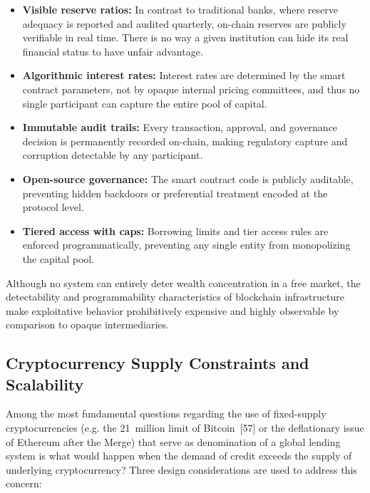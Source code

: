 \documentclass[12pt,a4paper]{report}
\begin{document}
\begin{itemize}[noitemsep]
\item \textbf{Visible reserve ratios:} In contrast to traditional banks, where reserve adequacy is reported and audited quarterly, on-chain reserves are publicly verifiable in real time. There is no way a given institution can hide its real financial status to have unfair advantage.
\item \textbf{Algorithmic interest rates:} Interest rates are determined by the smart contract parameters, not by opaque internal pricing committees, and thus no single participant can capture the entire pool of capital.
\item \textbf{Immutable audit trails:} Every transaction, approval, and governance decision is permanently recorded on-chain, making regulatory capture and corruption detectable by any participant.
\item \textbf{Open-source governance:} The smart contract code is publicly auditable, preventing hidden backdoors or preferential treatment encoded at the protocol level.
\item \textbf{Tiered access with caps:} Borrowing limits and tier access rules are enforced programmatically, preventing any single entity from monopolizing the capital pool.
\end{itemize}

Although no system can entirely deter wealth concentration in a free market, the detectability and programmability characteristics of blockchain infrastructure make exploitative behavior prohibitively expensive and highly observable by comparison to opaque intermediaries.

\subsection{Cryptocurrency Supply Constraints and Scalability}

Among the most fundamental questions regarding the use of fixed-supply cryptocurrencies (e.g. the 21~million limit of Bitcoin~[57] or the deflationary issue of Ethereum after the Merge) that serve as denomination of a global lending system is what would happen when the demand of credit exceeds the supply of underlying cryptocurrency? Three design considerations are used to address this concern:
\end{document}

